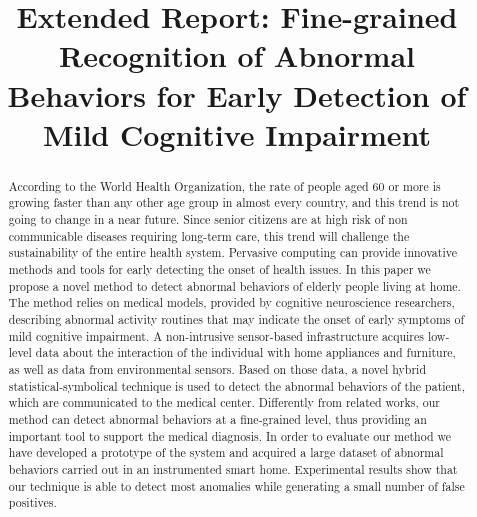 \documentclass[10pt, conference, compsocconf]{IEEEtran}
\begin{document}
\title{Extended Report: Fine-grained Recognition of Abnormal Behaviors for Early Detection of Mild Cognitive Impairment}









\author{
}




\maketitle

\begin{abstract}
According to the World Health Organization, the rate of people aged 60 or more is growing faster than any other age group in almost every country, and this trend is not going to change in a near future. Since senior citizens are at high risk of non communicable diseases requiring long-term care, this trend will challenge the sustainability of the entire health system. Pervasive computing can provide innovative methods and tools for early detecting the onset of health issues. In this paper we propose a novel method to detect abnormal behaviors of elderly people living at home. The method relies on medical models, provided by cognitive neuroscience researchers, describing abnormal activity routines that may indicate the onset of early symptoms of mild cognitive impairment. A non-intrusive sensor-based infrastructure acquires low-level data about the interaction of the individual with home appliances and furniture, as well as data from environmental sensors. Based on those data, a novel hybrid statistical-symbolical technique is used to detect the abnormal behaviors of the patient, which are communicated to the medical center. Differently from related works, our method can detect abnormal behaviors at a fine-grained level, thus providing an important tool to support the medical diagnosis. In order to evaluate our method we have developed a prototype of the system and acquired a large dataset of abnormal behaviors carried out in an instrumented smart home. Experimental results show that our technique is able to detect most anomalies while generating a small number of false positives.
\end{abstract}
\end{document}
